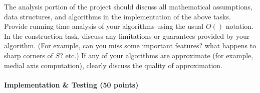 \documentclass[11pt]{article}
\begin{document}
The analysis portion of the project should discuss all mathematical assumptions, data structures, and algorithms in the implementation of the above tasks.  Provide running time analysis of your algorithms using the usual $O()$ notation.   In the construction task, discuss any limitations or guarantees provided by your algorithm. (For example,  can you miss some important features?  what happens to sharp corners of $S$?  etc.)   If any of your algorithms are approximate  (for example, medial axis computation),  clearly discuss the quality of approximation.  





\paragraph{ Implementation \& Testing (50 points)}
\end{document}
